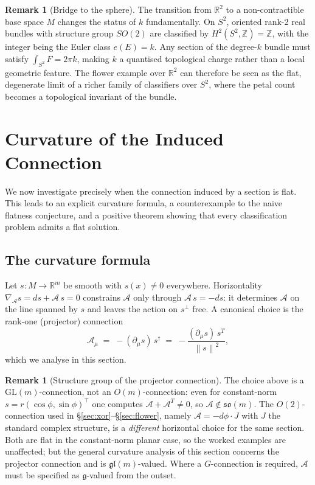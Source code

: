 \documentclass[11pt, a4paper]{article}
\theoremstyle{plain}
\theoremstyle{definition}
\newtheorem{remark}[theorem]{Remark}
\newcommand{\R}{\mathbb{R}}
\newcommand{\GL}{\mathrm{GL}}
\newcommand{\so}{\mathfrak{so}}
\newcommand{\Sig}{\mathcal{A}}
\newcommand{\del}{\partial}
\newcommand{\norm}[1]{\left\|#1\right\|}
\begin{document}
\begin{remark}[Bridge to the sphere]\label{rem:bridge}
The transition from $\R^2$ to a non-contractible base space $M$ changes the
status of $k$ fundamentally. On $S^2$, oriented rank-2 real bundles with structure
group $SO(2)$ are classified by $H^2(S^2, \mathbb{Z}) = \mathbb{Z}$,
with the integer being the Euler class $e(E) = k$. Any section of the degree-$k$
bundle must satisfy $\int_{S^2} F = 2\pi k$, making $k$ a quantised topological
charge rather than a local geometric feature. The flower example over $\R^2$ can
therefore be seen as the flat, degenerate limit of a richer family of classifiers
over $S^2$, where the petal count becomes a topological invariant of the bundle.
\end{remark}

\section{Curvature of the Induced Connection}\label{sec:curvature}

We now investigate precisely when the connection induced by a section is flat.
This leads to an explicit curvature formula, a counterexample to the naive
flatness conjecture, and a positive theorem showing that every classification
problem admits a flat solution.

\subsection{The curvature formula}

Let $s: M \to \R^m$ be smooth with $s(x) \neq 0$ everywhere. Horizontality
$\nabla_\Sig s = ds + \Sig\, s = 0$ constrains $\Sig$ only through
$\Sig\, s = -ds$: it determines $\Sig$ on the line spanned by $s$ and leaves the
action on $s^\perp$ free. A canonical choice is the rank-one (projector)
connection
\[
  \Sig_\mu \;=\; -(\del_\mu s)\,s^\dagger
  \;=\; -\frac{(\del_\mu s)\,s^T}{\norm{s}^2},
\]
which we analyse in this section.

\begin{remark}[Structure group of the projector connection]\label{rem:glm}
The choice above is a $\GL(m)$-connection, not an $O(m)$-connection: even for
constant-norm $s = r(\cos\phi,\sin\phi)^\top$ one computes
$\Sig + \Sig^T \neq 0$, so $\Sig \notin \so(m)$. The $O(2)$-connection used in
\S\ref{sec:xor}--\S\ref{sec:flower}, namely $\Sig = -d\phi \cdot J$ with
$J$ the standard complex structure, is a \emph{different} horizontal choice for
the same section. Both are flat in the constant-norm planar case, so the worked
examples are unaffected; but the general curvature analysis of this section
concerns the projector connection and is $\mathfrak{gl}(m)$-valued. Where a
$G$-connection is required, $\Sig$ must be specified as $\mathfrak{g}$-valued
from the outset.
\end{remark}
\end{document}
